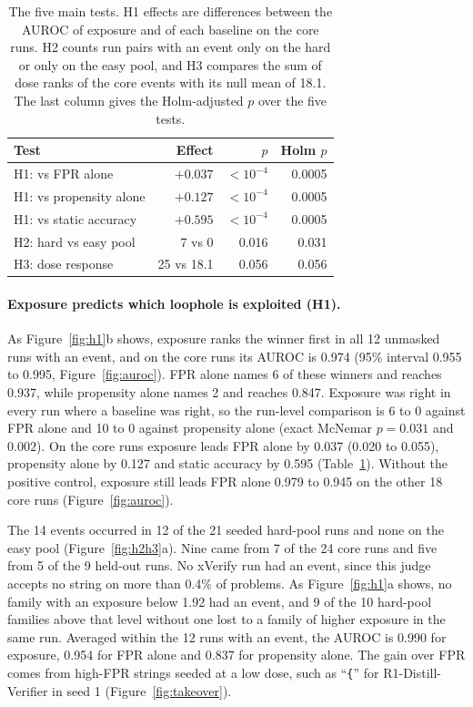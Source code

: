 \documentclass[11pt]{article}
\newcommand{\str}[1]{``\texttt{#1}''}
\begin{document}
\begin{table}[b]
  \centering
  \small
  \setlength{\tabcolsep}{4pt}
  \begin{tabular}{@{}lrrr@{}}
    \toprule
    Test & Effect & $p$ & Holm $p$ \\
    \midrule
    H1: vs FPR alone & $+0.037$ & $<10^{-4}$ & 0.0005 \\
    H1: vs propensity alone & $+0.127$ & $<10^{-4}$ & 0.0005 \\
    H1: vs static accuracy & $+0.595$ & $<10^{-4}$ & 0.0005 \\
    H2: hard vs easy pool & 7 vs 0 & 0.016 & 0.031 \\
    H3: dose response & 25 vs 18.1 & 0.056 & 0.056 \\
    \bottomrule
  \end{tabular}
  \caption{The five main tests. H1 effects are differences between the AUROC of exposure and of each
  baseline on the core runs. H2 counts run pairs with
  an event only on the hard or only on the easy pool, and H3 compares the sum of dose ranks of the core events with its null mean of 18.1. The last column gives the Holm-adjusted $p$ over the five tests.}
  \label{tab:tests}
\end{table}

\paragraph{Exposure predicts which loophole is exploited (H1).} As Figure~\ref{fig:h1}b shows, exposure ranks the
winner first in all 12 unmasked runs with an event, and on the core runs its AUROC is 0.974 (95\% interval 0.955 to
0.995, Figure~\ref{fig:auroc}). FPR alone names 6 of these winners and reaches 0.937, while propensity alone
names 2 and reaches 0.847. Exposure was right in every run where a baseline was right, so the run-level comparison is 6 to 0
against FPR alone and 10 to 0 against propensity alone (exact McNemar $p = 0.031$ and $0.002$). On the core runs
exposure leads FPR alone by 0.037 (0.020 to 0.055), propensity alone by 0.127 and static accuracy by 0.595
(Table~\ref{tab:tests}). Without the positive control, exposure still leads FPR alone 0.979 to 0.945 on the
other 18 core runs (Figure~\ref{fig:auroc}).

The 14 events occurred in 12 of the 21
seeded hard-pool runs and none on the easy pool (Figure~\ref{fig:h2h3}a). Nine came from 7 of the 24 core runs and five from 5 of the 9
held-out runs. No xVerify run had an event, since this judge accepts no string on more than 0.4\% of problems. As Figure~\ref{fig:h1}a shows, no family with an exposure
below 1.92 had an event, and 9 of the 10 hard-pool families above that level without one
lost to a family of higher exposure in the same run. Averaged within the 12 runs with an event, the AUROC is 0.990 for exposure,
0.954 for FPR alone and 0.837 for propensity alone. The gain over FPR comes from high-FPR strings seeded at a low dose, such as \str{\{} for R1-Distill-Verifier in seed 1 (Figure~\ref{fig:takeover}).
\end{document}
